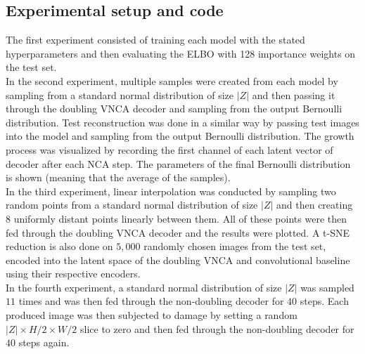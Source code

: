 \subsection{Experimental setup and code}

The first experiment consisted of training each model with the stated hyperparameters and then evaluating the ELBO with 128 importance weights on the test set.\\ 

In the second experiment, multiple samples were created from each model by sampling from a  standard normal distribution of size $|Z|$ and then passing it through the doubling VNCA decoder and sampling from the output Bernoulli distribution. Test reconstruction was done in a similar way by passing test images into the model and sampling from the output Bernoulli distribution. The growth process was visualized by recording the first channel of each latent vector of decoder after each NCA step. The parameters of the final Bernoulli distribution is shown (meaning that the average of the samples). \\

In the third experiment, linear interpolation was conducted by sampling two random points from a standard normal distribution of size $|Z|$ and then creating $8$ uniformly distant points linearly between them. All of these points were then fed through the doubling VNCA decoder and the results were plotted. A t-SNE reduction \cite{tSNE} is also done on $5,000$ randomly chosen images from the test set, encoded into the latent space of the doubling VNCA and convolutional baseline using their respective encoders.\\ %

In the fourth experiment, a standard normal distribution of size $|Z|$ was sampled $11$ times and was then fed through the non-doubling decoder for $40$ steps. Each produced image was then subjected to damage by setting a random $|Z| \times H / 2 \times W / 2$ slice to zero and then fed through the non-doubling decoder for $40$ steps again.\\

